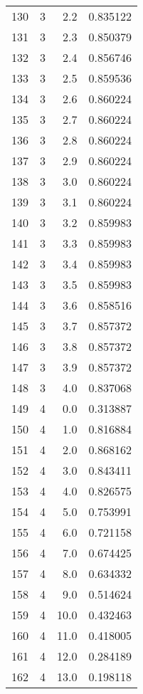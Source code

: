 \begin{tabular}{lrrr}
130 &        3 &      2.2 &  0.835122 \\
131 &        3 &      2.3 &  0.850379 \\
132 &        3 &      2.4 &  0.856746 \\
133 &        3 &      2.5 &  0.859536 \\
134 &        3 &      2.6 &  0.860224 \\
135 &        3 &      2.7 &  0.860224 \\
136 &        3 &      2.8 &  0.860224 \\
137 &        3 &      2.9 &  0.860224 \\
138 &        3 &      3.0 &  0.860224 \\
139 &        3 &      3.1 &  0.860224 \\
140 &        3 &      3.2 &  0.859983 \\
141 &        3 &      3.3 &  0.859983 \\
142 &        3 &      3.4 &  0.859983 \\
143 &        3 &      3.5 &  0.859983 \\
144 &        3 &      3.6 &  0.858516 \\
145 &        3 &      3.7 &  0.857372 \\
146 &        3 &      3.8 &  0.857372 \\
147 &        3 &      3.9 &  0.857372 \\
148 &        3 &      4.0 &  0.837068 \\
149 &        4 &      0.0 &  0.313887 \\
150 &        4 &      1.0 &  0.816884 \\
151 &        4 &      2.0 &  0.868162 \\
152 &        4 &      3.0 &  0.843411 \\
153 &        4 &      4.0 &  0.826575 \\
154 &        4 &      5.0 &  0.753991 \\
155 &        4 &      6.0 &  0.721158 \\
156 &        4 &      7.0 &  0.674425 \\
157 &        4 &      8.0 &  0.634332 \\
158 &        4 &      9.0 &  0.514624 \\
159 &        4 &     10.0 &  0.432463 \\
160 &        4 &     11.0 &  0.418005 \\
161 &        4 &     12.0 &  0.284189 \\
162 &        4 &     13.0 &  0.198118 \\

\end{tabular}
